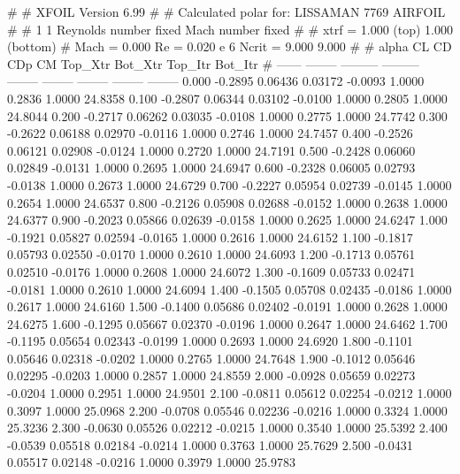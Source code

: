 #  
#       XFOIL         Version 6.99
#  
# Calculated polar for: LISSAMAN 7769 AIRFOIL                           
#  
# 1 1 Reynolds number fixed          Mach number fixed         
#  
# xtrf =   1.000 (top)        1.000 (bottom)  
# Mach =   0.000     Re =     0.020 e 6     Ncrit =   9.000  9.000
#  
#   alpha    CL        CD       CDp       CM     Top_Xtr  Bot_Xtr  Top_Itr  Bot_Itr
#  ------ -------- --------- --------- -------- -------- -------- -------- --------
   0.000  -0.2895   0.06436   0.03172  -0.0093   1.0000   0.2836   1.0000  24.8358
   0.100  -0.2807   0.06344   0.03102  -0.0100   1.0000   0.2805   1.0000  24.8044
   0.200  -0.2717   0.06262   0.03035  -0.0108   1.0000   0.2775   1.0000  24.7742
   0.300  -0.2622   0.06188   0.02970  -0.0116   1.0000   0.2746   1.0000  24.7457
   0.400  -0.2526   0.06121   0.02908  -0.0124   1.0000   0.2720   1.0000  24.7191
   0.500  -0.2428   0.06060   0.02849  -0.0131   1.0000   0.2695   1.0000  24.6947
   0.600  -0.2328   0.06005   0.02793  -0.0138   1.0000   0.2673   1.0000  24.6729
   0.700  -0.2227   0.05954   0.02739  -0.0145   1.0000   0.2654   1.0000  24.6537
   0.800  -0.2126   0.05908   0.02688  -0.0152   1.0000   0.2638   1.0000  24.6377
   0.900  -0.2023   0.05866   0.02639  -0.0158   1.0000   0.2625   1.0000  24.6247
   1.000  -0.1921   0.05827   0.02594  -0.0165   1.0000   0.2616   1.0000  24.6152
   1.100  -0.1817   0.05793   0.02550  -0.0170   1.0000   0.2610   1.0000  24.6093
   1.200  -0.1713   0.05761   0.02510  -0.0176   1.0000   0.2608   1.0000  24.6072
   1.300  -0.1609   0.05733   0.02471  -0.0181   1.0000   0.2610   1.0000  24.6094
   1.400  -0.1505   0.05708   0.02435  -0.0186   1.0000   0.2617   1.0000  24.6160
   1.500  -0.1400   0.05686   0.02402  -0.0191   1.0000   0.2628   1.0000  24.6275
   1.600  -0.1295   0.05667   0.02370  -0.0196   1.0000   0.2647   1.0000  24.6462
   1.700  -0.1195   0.05654   0.02343  -0.0199   1.0000   0.2693   1.0000  24.6920
   1.800  -0.1101   0.05646   0.02318  -0.0202   1.0000   0.2765   1.0000  24.7648
   1.900  -0.1012   0.05646   0.02295  -0.0203   1.0000   0.2857   1.0000  24.8559
   2.000  -0.0928   0.05659   0.02273  -0.0204   1.0000   0.2951   1.0000  24.9501
   2.100  -0.0811   0.05612   0.02254  -0.0212   1.0000   0.3097   1.0000  25.0968
   2.200  -0.0708   0.05546   0.02236  -0.0216   1.0000   0.3324   1.0000  25.3236
   2.300  -0.0630   0.05526   0.02212  -0.0215   1.0000   0.3540   1.0000  25.5392
   2.400  -0.0539   0.05518   0.02184  -0.0214   1.0000   0.3763   1.0000  25.7629
   2.500  -0.0431   0.05517   0.02148  -0.0216   1.0000   0.3979   1.0000  25.9783

